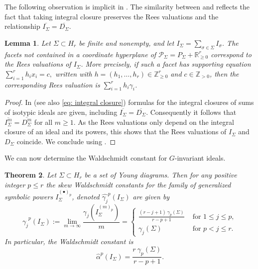 \documentclass[11pt, reqno]{amsart}
\numberwithin{equation}{section}
\newtheorem{theorem}{Theorem}[section]
\newtheorem{lemma}[theorem]{Lemma}
\theoremstyle{definition}
\newcommand{\ZZ}{{\mathbb Z}}
\newcommand{\RR}{{\mathbb R}}
\def\P{{\mathcal P}}
\begin{document}
The following observation is implicit in \cite[Corollary 3.16]{bdhmrational}. The similarity between
 and  reflects the fact that taking integral closure preserves the Rees valuations and the relationship $\overline{I_\Sigma}=\overline{D_\Sigma}$.

\begin{lemma}\label{thm: Rees_valuations I_Sigma}
Let $\Sigma\subset H_r$ be finite and nonempty, and let $I_\Sigma=\sum_{\sigma\in\Sigma}I_\sigma$. The  facets not contained in a coordinate hyperplane of
$\P_\Sigma=P_\Sigma+\RR_{\geq0}^r$  correspond to the Rees valuations of $I_\Sigma$. More precisely, if such a facet has supporting equation
$
\sum_{i=1}^r h_ix_i=c,
$
written with  $h=(h_1,\ldots,h_r)\in\ZZ_{\geq0}^r$ and $c\in\ZZ_{>0}$, then the corresponding Rees valuation is $\sum_{i=1}^rh_i\gamma_i$.
\end{lemma}

\begin{proof}
In \cite[Theorem 8.2]{deconcini1980young} (see also \eqref{eq: integral closure}) formulas for the integral closures of sums of  isotypic ideals are given, including  $\overline{I_\Sigma}=\overline{D_\Sigma}$. Consequently it follows that $\overline{I_\Sigma^m}=\overline{D_\Sigma^m}$ for all $m\geq 1$. As the Rees valuations only depend on the integral closure of an ideal and its powers, this shows that the Rees valuations of $I_\Sigma$ and $D_\Sigma$ coincide. We conclude using  .
\end{proof}

We can now determine the Waldschmidt constant for  $G$-invariant ideals.

\begin{theorem}\label{theorem: waldschmidt constant one diagram}
Let $\Sigma\subset H_r$ be a set of Young diagrams. Then for any positive integer $p\leq r$ the skew
Waldschmidt constants for the family of generalized symbolic powers $I_\Sigma^{(\bullet)_p}$, denoted  $\widehat{\gamma_j}^p(I_\Sigma)$ are given by
\[
\widehat{\gamma_j}^p(I_\Sigma):=\lim_{m\to\infty}\frac{\gamma_j\left (I_\Sigma^{(m)_p}\right )}{m}=
\begin{cases}
\frac{(r-j+1) \ \gamma_{p}(\Sigma)}{r-p+1} & \text{ for } 1\leq j\leq p,\\
\gamma_j(\Sigma)& \text{ for } p< j\leq r.
\end{cases}
\]
In particular, the Waldschmidt constant is
\[
\widehat{\alpha}^p(I_\Sigma)=\frac{r \ \gamma_{p}(\Sigma)}{r-p+1}.
\]
\end{theorem}
\end{document}
